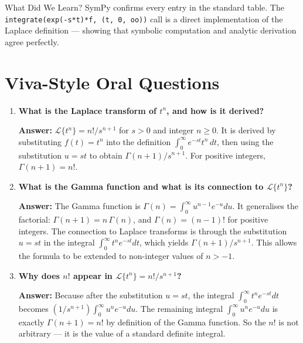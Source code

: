 \documentclass[12pt,a4paper]{article}
\begin{document}
\begin{learnbox}{What Did We Learn?}
SymPy confirms every entry in the standard table. The \texttt{integrate(exp(-s*t)*f, (t, 0, oo))}
call is a direct implementation of the Laplace definition --- showing that symbolic
computation and analytic derivation agree perfectly.
\end{learnbox}

\section{Viva-Style Oral Questions}

\begin{enumerate}[leftmargin=*, label=\textbf{Q\arabic*.}]

\item \textbf{What is the Laplace transform of $t^n$, and how is it derived?}

\textbf{Answer:} $\mathcal{L}\{t^n\} = n!/s^{n+1}$ for $s > 0$ and integer $n \geq 0$.
It is derived by substituting $f(t) = t^n$ into the definition
$\int_0^\infty e^{-st} t^n \, dt$, then using the substitution $u = st$
to obtain $\Gamma(n+1)/s^{n+1}$. For positive integers, $\Gamma(n+1) = n!$.

\item \textbf{What is the Gamma function and what is its connection to $\mathcal{L}\{t^n\}$?}

\textbf{Answer:} The Gamma function is $\Gamma(n) = \int_0^\infty u^{n-1} e^{-u} du$.
It generalises the factorial: $\Gamma(n+1) = n\,\Gamma(n)$, and $\Gamma(n) = (n-1)!$ for
positive integers. The connection to Laplace transforms is through the substitution
$u = st$ in the integral $\int_0^\infty t^n e^{-st} dt$, which yields $\Gamma(n+1)/s^{n+1}$.
This allows the formula to be extended to non-integer values of $n > -1$.

\item \textbf{Why does $n!$ appear in $\mathcal{L}\{t^n\} = n!/s^{n+1}$?}

\textbf{Answer:} Because after the substitution $u = st$, the integral
$\int_0^\infty t^n e^{-st} dt$ becomes $(1/s^{n+1})\int_0^\infty u^n e^{-u} du$.
The remaining integral $\int_0^\infty u^n e^{-u} du$ is exactly $\Gamma(n+1) = n!$ by
definition of the Gamma function. So the $n!$ is not arbitrary --- it is the value
of a standard definite integral.


\end{enumerate}
\end{document}
